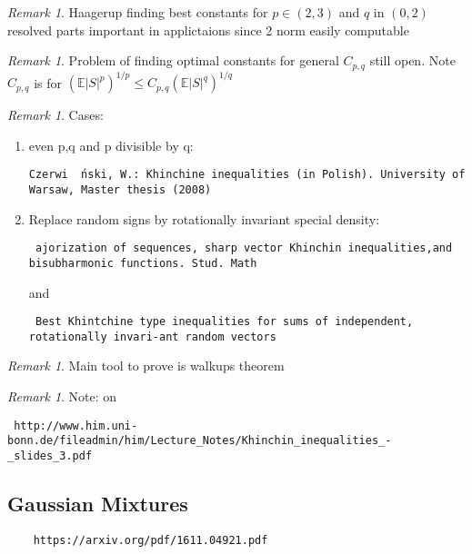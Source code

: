 \documentclass[10pt]{article}
\newcommand{\E}{\mathbb{E}}
\newcommand{\1}{\textbf{1}}
\theoremstyle{remark}
\newtheorem{remark}[theorem]{Remark}
\theoremstyle{definition}
\begin{document}
\begin{remark}
	Haagerup finding best constants for $p \in (2,3)$ and $q$ in $(0,2)$ resolved parts important in applictaions since 2 norm easily computable
\end{remark}

\begin{remark}
	Problem of finding optimal constants for general $C_{p,q}$ still open. Note $C_{p,q}$ is for $(\E|S|^p)^{1/p} \leq C_{p,q} (\E|S|^q)^{1/q}$
\end{remark}

\begin{remark}
	Cases:
	\begin{enumerate}
		\item even p,q and p divisible by q: \begin{verbatim}Czerwi  ́nski, W.: Khinchine inequalities (in Polish). University of Warsaw, Master thesis (2008)\end{verbatim}
		\item Replace random signs by rotationally invariant special density: \begin{verbatim} ajorization of sequences, sharp vector Khinchin inequalities,and bisubharmonic functions. Stud. Math \end{verbatim} and \begin{verbatim} Best Khintchine type inequalities for sums of independent, rotationally invari-ant random vectors \end{verbatim}
	\end{enumerate}
\end{remark}

\begin{remark}
	Main tool to prove is walkups theorem
\end{remark}

\begin{remark}
	Note: on \begin{verbatim} http://www.him.uni-bonn.de/fileadmin/him/Lecture_Notes/Khinchin_inequalities_-_slides_3.pdf \end{verbatim}
\end{remark}

\subsection{Gaussian Mixtures}

\begin{verbatim}
	https://arxiv.org/pdf/1611.04921.pdf
\end{verbatim}
\end{document}
